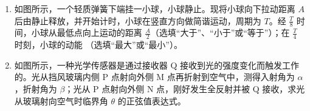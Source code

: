 \documentclass[\gkver]{gaokaozhenti}
\begin{document}
\begin{enumerate}
{	$p_{1}=1.3\times10^{5}\UPa$
}

\item
如图所示，一个轻质弹簧下端挂一小球，小球静止。现将小球向下拉动距离 $A$ 后由静止释放，并开始计时，小球在竖直方向做简谐运动，周期为 $T$。经 $\frac{T}{8}$ 时间，小球从最低点向上运动的距离  $\frac{A}{2}$（选填“大于”、“小于”或“等于”）；在 $\frac{T}{4}$ 时刻，小球的动能 （选填“最大”或“最小”）。



\item
如图所示，一种光学传感器是通过接收器 Q 接收到光的强度变化而触发工作的。光从挡风玻璃内侧 P 点射向外侧 M 点再折射到空气中，测得入射角为 $\alpha$，折射角为 $\beta$；光从 P 点射向外侧 N 点，刚好发生全反射并被 Q 接收，求光从玻璃射向空气时临界角 $\theta$ 的正弦值表达式。


\jdanswer{
$\frac{\sin\alpha}{\sin\beta}$
}

\end{enumerate}
\end{document}
